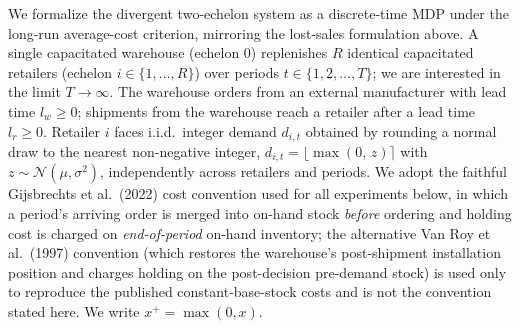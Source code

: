 \documentclass[11pt]{article}
\begin{document}
We formalize the divergent two-echelon system as a discrete-time MDP under the long-run
average-cost criterion, mirroring the lost-sales formulation above. A single capacitated
warehouse (echelon $0$) replenishes $R$ identical capacitated retailers (echelon
$i\in\{1,\dots,R\}$) over periods $t\in\{1,2,\dots,T\}$; we are interested in the limit
$T\to\infty$. The warehouse orders from an external manufacturer with lead time $l_w\ge 0$;
shipments from the warehouse reach a retailer after a lead time $l_r\ge 0$. Retailer $i$ faces
i.i.d.\ integer demand $d_{i,t}$ obtained by rounding a normal draw to the nearest non-negative
integer, $d_{i,t}=\big\lfloor \max(0,\,z)\big\rceil$ with $z\sim\mathcal N(\mu,\sigma^2)$,
independently across retailers and periods. We adopt the faithful Gijsbrechts et al.\ (2022) cost
convention \citep{gijsbrechts2022drl} used for all experiments below, in which a period's arriving
order is merged into on-hand stock \emph{before} ordering and holding cost is charged on
\emph{end-of-period} on-hand inventory; the alternative Van Roy et al.\ (1997) convention
\citep{vanroy1997ndp} (which restores the warehouse's post-shipment installation position and charges
holding on the post-decision pre-demand stock) is used only to reproduce the published
constant-base-stock costs and is not the convention stated here. We write $x^+=\max(0,x)$.
\end{document}
